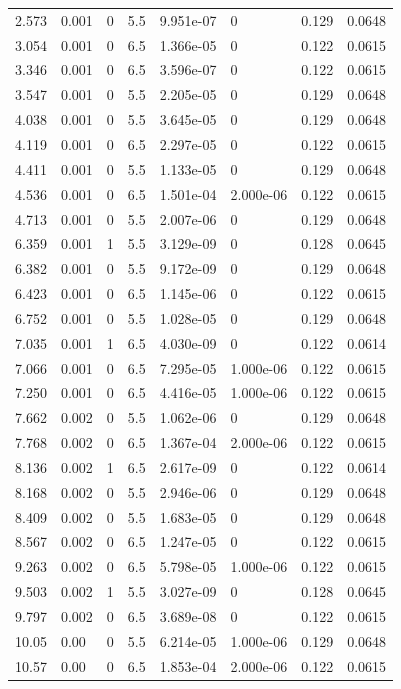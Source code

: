 \documentclass[preview]{standalone}
\begin{document}
{{\begin{tabular}{L{1.2cm}C{1.2cm} C{0.3cm}C{0.5cm} C{1.4cm}C{1.4cm} C{1.4cm}C{1.4cm}}
  2.573  &  0.001  & 0     & 5.5 &  9.951e-07  & 0  & 0.129 &  0.0648   \\ 
  3.054  &  0.001  & 0     & 6.5 &  1.366e-05  & 0  & 0.122 &  0.0615   \\ 
  3.346  &  0.001  & 0     & 6.5 &  3.596e-07  & 0  & 0.122 &  0.0615   \\ 
  3.547  &  0.001  & 0     & 5.5 &  2.205e-05  & 0  & 0.129 &  0.0648   \\ 
  4.038  &  0.001  & 0     & 5.5 &  3.645e-05  & 0  & 0.129 &  0.0648   \\ 
  4.119  &  0.001  & 0     & 6.5 &  2.297e-05  & 0  & 0.122 &  0.0615   \\ 
  4.411  &  0.001  & 0     & 5.5 &  1.133e-05  & 0  & 0.129 &  0.0648   \\ 
  4.536  &  0.001  & 0     & 6.5 &  1.501e-04  & 2.000e-06  & 0.122 &  0.0615   \\ 
  4.713  &  0.001  & 0     & 5.5 &  2.007e-06  & 0  & 0.129 &  0.0648   \\ 
  6.359  &  0.001  & 1     & 5.5 &  3.129e-09  & 0  & 0.128 &  0.0645   \\ 
  6.382  &  0.001  & 0     & 5.5 &  9.172e-09  & 0  & 0.129 &  0.0648   \\ 
  6.423  &  0.001  & 0     & 6.5 &  1.145e-06  & 0  & 0.122 &  0.0615   \\ 
  6.752  &  0.001  & 0     & 5.5 &  1.028e-05  & 0  & 0.129 &  0.0648   \\ 
  7.035  &  0.001  & 1     & 6.5 &  4.030e-09  & 0  & 0.122 &  0.0614   \\ 
  7.066  &  0.001  & 0     & 6.5 &  7.295e-05  & 1.000e-06  & 0.122 &  0.0615   \\ 
  7.250  &  0.001  & 0     & 6.5 &  4.416e-05  & 1.000e-06  & 0.122 &  0.0615   \\ 
  7.662  &  0.002  & 0     & 5.5 &  1.062e-06  & 0  & 0.129 &  0.0648   \\ 
  7.768  &  0.002  & 0     & 6.5 &  1.367e-04  & 2.000e-06  & 0.122 &  0.0615   \\ 
  8.136  &  0.002  & 1     & 6.5 &  2.617e-09  & 0  & 0.122 &  0.0614   \\ 
  8.168  &  0.002  & 0     & 5.5 &  2.946e-06  & 0  & 0.129 &  0.0648   \\ 
  8.409  &  0.002  & 0     & 5.5 &  1.683e-05  & 0  & 0.129 &  0.0648   \\ 
  8.567  &  0.002  & 0     & 6.5 &  1.247e-05  & 0  & 0.122 &  0.0615   \\ 
  9.263  &  0.002  & 0     & 6.5 &  5.798e-05  & 1.000e-06  & 0.122 &  0.0615   \\ 
  9.503  &  0.002  & 1     & 5.5 &  3.027e-09  & 0  & 0.128 &  0.0645   \\ 
  9.797  &  0.002  & 0     & 6.5 &  3.689e-08  & 0  & 0.122 &  0.0615   \\ 
  10.05  &  0.00  & 0     & 5.5 &  6.214e-05  & 1.000e-06  & 0.129 &  0.0648   \\ 
  10.57  &  0.00  & 0     & 6.5 &  1.853e-04  & 2.000e-06  & 0.122 &  0.0615   \\ 
\hline 
\end{tabular} 

}}
\end{document}
